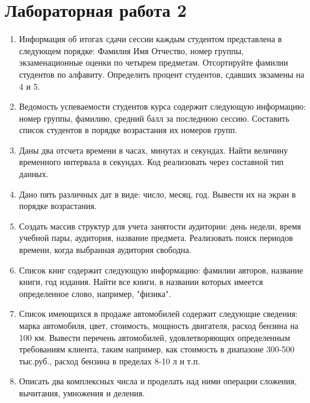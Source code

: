 \section{Лабораторная работа 2}
\begin{enumerate}[leftmargin=*]
    \item Информация об итогах сдачи сессии каждым студентом представлена в следующем порядке: Фамилия Имя Отчество, номер группы, экзаменационные оценки по четырем предметам. 
    Отсортируйте фамилии студентов по алфавиту. Определить процент студентов, сдавших экзамены на 4 и 5.
    \item Ведомость успеваемости студентов курса содержит следующую информацию: номер группы, фамилию, средний балл за последнюю сессию. Составить список студентов в порядке возрастания их номеров групп.
    \item Даны два отсчета времени в часах, минутах и секундах. Найти величину временного интервала в секундах. Код реализовать через составной тип данных.
    \item Дано пять различных дат в виде: число, месяц, год. Вывести их на экран в порядке возрастания.
    \item Создать массив структур для учета занятости аудитории: день недели, время учебной пары, аудитория, название предмета. Реализовать поиск периодов времени, когда выбранная аудитория свободна.
    \item Список книг содержит следующую информацию: фамилии авторов, название книги, год издания. Найти все книги, в названии которых имеется определенное слово, например, "физика".
    \item Список имеющихся в продаже автомобилей содержит следующие сведения: марка автомобиля, цвет, стоимость, мощность двигателя, расход бензина на 100 км. Вывести перечень автомобилей, удовлетворяющих определенным требованиям клиента, таким например, как стоимость в диапазоне 300-500 тыс.руб., расход бензина в пределах 8-10 л и т.п.
    \item Описать два комплексных числа и проделать над ними операции сложения, вычитания, умножения и деления.
\end{enumerate}
